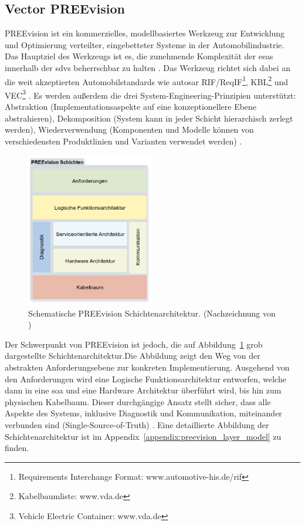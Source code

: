 \subsection{Vector PREEvision}
PREEvision ist ein kommerzielles, modellbasiertes Werkzeug zur Entwicklung und Optimierung verteilter, eingebetteter Systeme in der Automobilindustrie. Das Hauptziel des Werkzeugs ist es, die zunehmende Komplexität der \glspl{eea} innerhalb der \glspl{sdv} beherrschbar zu halten \cite{askaripoor2022architecture}. Das  Werkzeug richtet sich dabei an die weit akzeptierten Automobilstandards wie \gls{autosar} RIF/ReqIF\footnote{Requirements Interchange Format: www.automotive-his.de/rif}, KBL\footnote{Kabelbaumliste: www.vda.de
} und VEC\footnote{Vehicle Electric Container: www.vda.de} \cite{schauffele2016architectural}. Es werden außerdem die drei System-Engineering-Prinzipien unterstützt: Abstraktion (Implementationsaspekte auf eine konzeptionellere Ebene abstrahieren), Dekomposition (System kann in jeder Schicht hierarchisch zerlegt werden), Wiederverwendung (Komponenten und Modelle können von verschiedensten Produktlinien und Varianten verwendet werden) \cite{schauffele2016architectural}.

\begin{figure}[h!]
  \centering
  \includegraphics[width=0.5\textwidth]{figures/PREEVISION_LAYER.drawio.png}
  \caption{Schematische PREEvision Schichtenarchitektur. (Nachzeichnung von \cite{vectorinformatikgmbhpreevision})}
  \label{fig:preevision_schicht}
\end{figure}

Der Schwerpunkt von PREEvision ist jedoch, die auf Abbildung~\ref{fig:preevision_schicht} grob dargestellte Schichtenarchitektur.Die Abbildung zeigt den Weg von der abstrakten Anforderungsebene zur konkreten Implementierung. Ausgehend von den Anforderungen wird eine Logische Funktionsarchitektur entworfen, welche dann in eine \gls{soa} und eine Hardware Architektur überführt wird, bis hin zum physischen Kabelbaum. Dieser durchgängige Ansatz stellt sicher, dass alle Aspekte des Systems, inklusive Diagnostik und Kommunikation, miteinander verbunden sind (Single-Source-of-Truth) \cite{schauffele2016architectural}. Eine detaillierte Abbildung der Schichtenarchitektur ist im Appendix~\ref{appendix:preevision_layer_model} zu finden.



